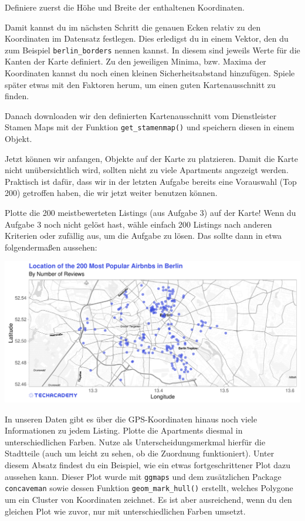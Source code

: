 \documentclass[
]{book}
\begin{document}
Definiere zuerst die Höhe und Breite der enthaltenen Koordinaten.

Damit kannst du im nächsten Schritt die genauen Ecken relativ zu den Koordinaten im Datensatz festlegen.
Dies erledigst du in einem Vektor, den du zum Beispiel \texttt{berlin\_borders} nennen kannst.
In diesem sind jeweils Werte für die Kanten der Karte definiert.
Zu den jeweiligen Minima, bzw. Maxima der Koordinaten kannst du noch einen kleinen Sicherheitsabstand hinzufügen.
Spiele später etwas mit den Faktoren herum, um einen guten Kartenausschnitt zu finden.

Danach downloaden wir den definierten Kartenausschnitt vom Dienstleister Stamen Maps mit der Funktion \texttt{get\_stamenmap()} und speichern diesen in einem Objekt.

Jetzt können wir anfangen, Objekte auf der Karte zu platzieren.
Damit die Karte nicht unübersichtlich wird, sollten nicht zu viele Apartments angezeigt werden.
Praktisch ist dafür, dass wir in der letzten Aufgabe bereits eine Vorauswahl (Top 200) getroffen haben, die wir jetzt weiter benutzen können.

Plotte die 200 meistbewerteten Listings (aus Aufgabe 3) auf der Karte!
Wenn du Aufgabe 3 noch nicht gelöst hast, wähle einfach 200 Listings nach anderen Kriterien oder zufällig aus, um die Aufgabe zu lösen.
Das sollte dann in etwa folgendermaßen aussehen:

\includegraphics[width=1\linewidth]{plots/4_1_map_top200_simple}

In unseren Daten gibt es über die GPS-Koordinaten hinaus noch viele Informationen zu jedem Listing.
Plotte die Apartments diesmal in unterschiedlichen Farben.
Nutze als Unterscheidungsmerkmal hierfür die Stadtteile (auch um leicht zu sehen, ob die Zuordnung funktioniert).
Unter diesem Absatz findest du ein Beispiel, wie ein etwas fortgeschrittener Plot dazu aussehen kann.
Dieser Plot wurde mit \texttt{ggmaps} und dem zusätzlichen Package \texttt{concaveman} sowie dessen Funktion \texttt{geom\_mark\_hull()} erstellt, welches Polygone um ein Cluster von Koordinaten zeichnet.
Es ist aber ausreichend, wenn du den gleichen Plot wie zuvor, nur mit unterschiedlichen Farben umsetzt.
\end{document}
